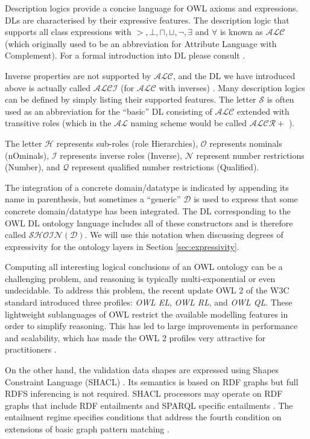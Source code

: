 	Description logics provide a concise language for OWL axioms and expressions. DLs are characterised by their expressive features. The description logic that supports all class expressions with $>, \bot, \sqcap, \sqcup, \neg, \exists$ and $\forall$ is known as $\mathcal{ALC}$ (which originally used to be an abbreviation for Attribute Language with Complement). For a formal introduction into DL please consult \citep{dl-baader2004description}.
	
	Inverse properties are not supported by $\mathcal{ALC}$, and the DL we have introduced above is actually called $\mathcal{ALCI}$ (for $\mathcal{ALC}$ with inverses) \cite{krotzsch2012owl}. Many description logics can be defined by simply listing their supported features. The letter $\mathcal{S}$ is often used as an abbreviation for the ``basic'' DL consisting of $\mathcal{ALC}$ extended with transitive roles (which in the $\mathcal{AL}$ naming scheme would be called $\mathcal{ALCR+}$  ). 
	
	The letter $\mathcal{H}$ represents sub-roles (role Hierarchies), $\mathcal{O}$ represents nominals (nOminals), $\mathcal{I}$ represents inverse roles (Inverse), $\mathcal{N}$ represent number restrictions (Number), and $\mathcal{Q}$ represent qualified number restrictions (Qualified). 
	
	The integration of a concrete domain/datatype is indicated by appending its name in parenthesis, but sometimes a ``generic'' $\mathcal{D}$ is used to express that some concrete domain/datatype has been integrated. The DL corresponding to the OWL DL ontology language includes all of these constructors and is therefore called
	$\mathcal{SHOIN(D)}$. We will use this notation when discussing degrees of expressivity for the ontology layers in Section \ref{sec:expressivity}.
	
	Computing all interesting logical conclusions of an OWL ontology can be a challenging problem, and reasoning is typically multi-exponential or even undecidable. To address this problem, the recent update OWL 2 of the W3C standard \citep{owl2.0,owl2} introduced three profiles: \textit{OWL EL}, \textit{OWL RL}, and \textit{OWL QL}. These lightweight sublanguages of OWL restrict the available modelling features in order to simplify reasoning. This has led to large improvements in performance and scalability, which has made the OWL 2 profiles very attractive for practitioners \citep{krotzsch2012owl}.
	
	On the other hand, the validation data shapes are expressed using Shapes Constraint Language (SHACL) \cite{shacl-spec}. Its semantics is based on RDF graphs but full RDFS inferencing is not required. SHACL processors may operate on RDF graphs that include RDF entailments \citep{rdf11-semantics} and SPARQL specific entailments \citep{sparql11-entailment}. The entailment regime specifies conditions that address the fourth condition on extensions of basic graph pattern matching \citep{rdf-semantics,rdf11-semantics}. 
	
